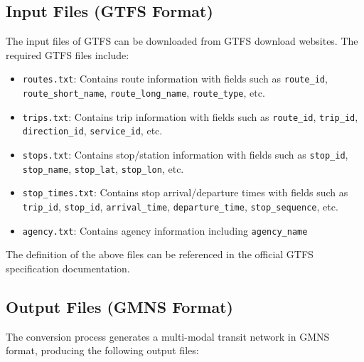 \documentclass[11pt,a4paper]{article}
\begin{document}
\subsection{Input Files (GTFS Format)}

The input files of GTFS can be downloaded from GTFS download websites. The required GTFS files include:

\begin{itemize}
    \item \texttt{routes.txt}: Contains route information with fields such as \texttt{route\_id}, \texttt{route\_short\_name}, \texttt{route\_long\_name}, \texttt{route\_type}, etc.
    \item \texttt{trips.txt}: Contains trip information with fields such as \texttt{route\_id}, \texttt{trip\_id}, \texttt{direction\_id}, \texttt{service\_id}, etc.
    \item \texttt{stops.txt}: Contains stop/station information with fields such as \texttt{stop\_id}, \texttt{stop\_name}, \texttt{stop\_lat}, \texttt{stop\_lon}, etc.
    \item \texttt{stop\_times.txt}: Contains stop arrival/departure times with fields such as \texttt{trip\_id}, \texttt{stop\_id}, \texttt{arrival\_time}, \texttt{departure\_time}, \texttt{stop\_sequence}, etc.
    \item \texttt{agency.txt}: Contains agency information including \texttt{agency\_name}
\end{itemize}

The definition of the above files can be referenced in the official GTFS specification documentation.

\subsection{Output Files (GMNS Format)}

The conversion process generates a multi-modal transit network in GMNS format, producing the following output files:
\end{document}
